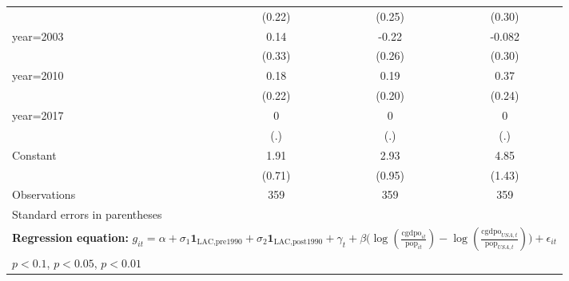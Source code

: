 \begin{sidewaystable}[htbp]
\begin{tabular}{l*{3}{c}}
                &   (0.22)         &   (0.25)         &   (0.30)         \\
\addlinespace
year=2003       &     0.14         &    -0.22         &   -0.082         \\
                &   (0.33)         &   (0.26)         &   (0.30)         \\
\addlinespace
year=2010       &     0.18         &     0.19         &     0.37         \\
                &   (0.22)         &   (0.20)         &   (0.24)         \\
\addlinespace
year=2017       &        0         &        0         &        0         \\
                &      (.)         &      (.)         &      (.)         \\
\addlinespace
Constant        &     1.91\sym{***}&     2.93\sym{***}&     4.85\sym{***}\\
                &   (0.71)         &   (0.95)         &   (1.43)         \\
\midrule
Observations    &      359         &      359         &      359         \\
\bottomrule
\multicolumn{4}{l}{\footnotesize Standard errors in parentheses}\\
\multicolumn{4}{l}{\footnotesize \textbf{Regression equation:} \(g_{it} = \alpha + \sigma_1 \mathbf{1}_{\textrm{LAC,pre1990}} + \sigma_2 \mathbf{1}_{\textrm{LAC,post1990}} + \gamma_t + \beta \big(\log (\frac{\textrm{cgdpo}_{it}}{\textrm{pop}_{it}} ) - \log (\frac{\textrm{cgdpo}_{USA,t}}{\textrm{pop}_{USA,t}}  ) \big) + \epsilon_{it}\)}\\
\multicolumn{4}{l}{\footnotesize \sym{*} \(p<0.1\), \sym{**} \(p<0.05\), \sym{***} \(p<0.01\)}\\
\end{tabular}
\end{sidewaystable}
